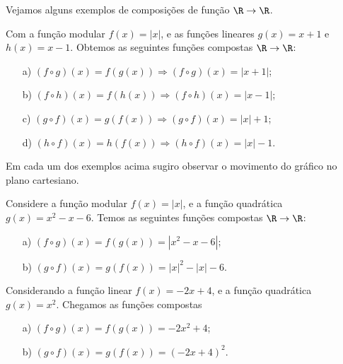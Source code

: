 Vejamos alguns exemplos de composições de função $\R \to \R$.

\begin{exem}
Com a função modular $f(x)= |x|$, e as funções lineares $g(x)= x+1$ e $h(x)= x-1$. Obtemos as seguintes funções compostas $\R \to \R$:
\begin{enumerate}
\item [a)] $(f \circ g)(x)= f(g(x)) \Rightarrow (f \circ g)(x)= |x+1|$;
\item [b)] $(f \circ h)(x)= f(h(x)) \Rightarrow (f \circ h)(x)= |x-1|$;
\item [c)] $(g \circ f)(x)= g(f(x)) \Rightarrow (g \circ f)(x)= |x|+1$;
\item [d)] $(h \circ f)(x)= h(f(x)) \Rightarrow (h \circ f)(x)= |x|-1$.
\end{enumerate}
Em cada um dos exemplos acima sugiro observar o movimento do gráfico no plano cartesiano.
\end{exem}

\begin{exem}
Considere a função modular $f(x)= |x|$, e a função quadrática $g(x)= x^2-x-6$. Temos as seguintes funções compostas $\R \to \R$:
\begin{enumerate}
\item [a)] $(f \circ g)(x)= f(g(x))= |x^2-x-6|$;
\item [b)] $(g \circ f)(x)= g(f(x))= |x|^2 - |x|- 6$.
\end{enumerate}
\end{exem}

\begin{exem}
Considerando a função linear $f(x)= -2x+4$, e a função quadrática $g(x)= x^2$. Chegamos as funções compostas 
\begin{enumerate}
\item [a)] $(f \circ g)(x)= f(g(x))= -2x^2 + 4$;
\item [b)] $(g \circ f)(x)= g(f(x))= (-2x+4)^2$.
\end{enumerate}
\end{exem}

